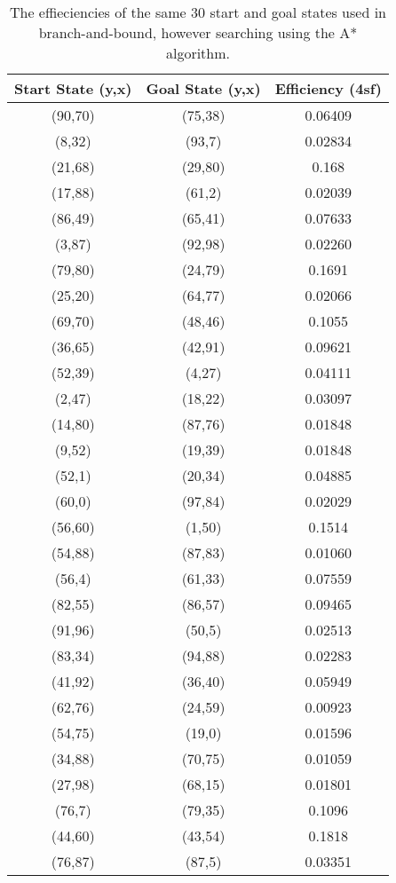 \documentclass[11pt,oneside]{article}
\begin{document}
\begin{table}[ht]
    \centering
    \begin{tabular}{|c|c|c|}
	Start State (y,x)	&Goal State (y,x)	&Efficiency (4sf) \\ \hline
	(90,70)		&(75,38)		&0.06409 \\
	(8,32)			&(93,7)		&0.02834 \\
	(21,68)		&(29,80)		&0.168 \\
	(17,88)		&(61,2)		&0.02039 \\
	(86,49)		&(65,41)		&0.07633 \\
	(3,87)			&(92,98)  		&0.02260 \\
	(79,80)		&(24,79)		&0.1691 \\
	(25,20)		&(64,77)		&0.02066 \\
	(69,70)		&(48,46)		&0.1055 \\
	(36,65)		&(42,91)		&0.09621 \\
	(52,39)		&(4,27)		&0.04111 \\
	(2,47)			&(18,22)		&0.03097 \\
	(14,80)		&(87,76)		&0.01848 \\
	(9,52)			&(19,39)		&0.01848 \\
	(52,1)			&(20,34)		&0.04885 \\
	(60,0)			&(97,84)		&0.02029 \\
	(56,60)		&(1,50)		&0.1514 \\
	(54,88)		&(87,83)		&0.01060 \\
	(56,4)			&(61,33)		&0.07559 \\
	(82,55)		&(86,57)		&0.09465 \\
	(91,96)		&(50,5)		&0.02513 \\
	(83,34)		&(94,88)		&0.02283 \\
	(41,92)		&(36,40)		&0.05949 \\
	(62,76)		&(24,59)		&0.00923 \\
	(54,75)		&(19,0)		&0.01596 \\
	(34,88)		&(70,75)		&0.01059 \\
	(27,98)		&(68,15)		&0.01801 \\
	(76,7)			&(79,35)		&0.1096 \\
	(44,60)		&(43,54)		&0.1818 \\
	(76,87)		&(87,5)		&0.03351 \\

    \end{tabular}
    \caption{The effieciencies of the same 30 start and goal states used in branch-and-bound, however searching using the A* algorithm.}
    \label{tab:astareff}
\end{table}
\end{document}

